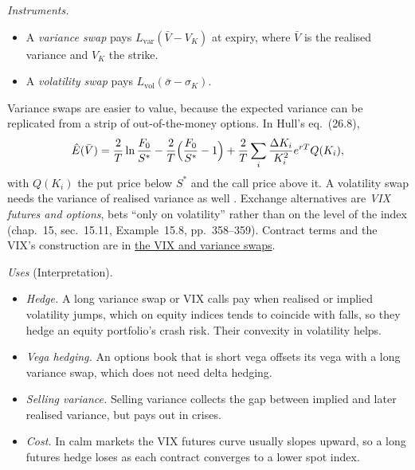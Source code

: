 \begin{qfmethod}\label{meth:volatility-derivative-applications}
 \emph{Instruments.}
\begin{itemize}
\item A \emph{variance swap} pays $L_{\text{var}}(\bar V-V_K)$ at expiry, where $\bar V$ is the realised variance and $V_K$ the strike.
\item A \emph{volatility swap} pays $L_{\text{vol}}(\bar\sigma-\sigma_K)$.
\end{itemize}
Variance swaps are easier to value, because the expected variance can be replicated from a strip of out-of-the-money options. In Hull's eq.~(26.8),
\[ \hat E(\bar V)=\frac2T\ln\frac{F_0}{S^*}-\frac2T\Bigl(\frac{F_0}{S^*}-1\Bigr)+\frac2T\sum_i\frac{\Delta K_i}{K_i^2}e^{rT}Q(K_i), \]
with $Q(K_i)$ the put price below $S^*$ and the call price above it. A volatility swap needs the variance of realised variance as well \citep[chap.~26, sec.~26.16, pp.~629--632]{s7-hulloptions}. Exchange alternatives are \emph{VIX futures and options}, bets ``only on volatility'' rather than on the level of the index (chap.~15, sec.~15.11, Example~15.8, pp.~358--359). Contract terms and the VIX's construction are in \hyperref[def:vix-variance-dividend-swaps]{the VIX and variance swaps}.

\emph{Uses} (Interpretation).
\begin{itemize}
\item \emph{Hedge.} A long variance swap or VIX calls pay when realised or implied volatility jumps, which on equity indices tends to coincide with falls, so they hedge an equity portfolio's crash risk. Their convexity in volatility helps.
\item \emph{Vega hedging.} An options book that is short vega offsets its vega with a long variance swap, which does not need delta hedging.
\item \emph{Selling variance.} Selling variance collects the gap between implied and later realised variance, but pays out in crises.
\item \emph{Cost.} In calm markets the VIX futures curve usually slopes upward, so a long futures hedge loses as each contract converges to a lower spot index.
\end{itemize}


\end{qfmethod}
